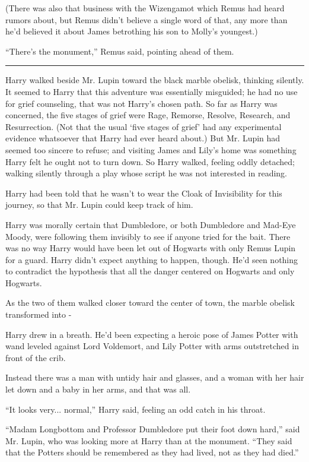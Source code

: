 (There was also that business with the Wizengamot which Remus had heard rumors about, but Remus didn't believe a single word of that, any more than he'd believed it about James betrothing his son to Molly's youngest.)

``There's the monument,'' Remus said, pointing ahead of them.

\begin{center}\rule{3in}{0.4pt}\end{center}

Harry walked beside Mr. Lupin toward the black marble obelisk, thinking silently. It seemed to Harry that this adventure was essentially misguided; he had no use for grief counseling, that was not Harry's chosen path. So far as Harry was concerned, the five stages of grief were Rage, Remorse, Resolve, Research, and Resurrection. (Not that the usual `five stages of grief' had any experimental evidence whatsoever that Harry had ever heard about.) But Mr. Lupin had seemed too sincere to refuse; and visiting James and Lily's home was something Harry felt he ought not to turn down. So Harry walked, feeling oddly detached; walking silently through a play whose script he was not interested in reading.

Harry had been told that he wasn't to wear the Cloak of Invisibility for this journey, so that Mr. Lupin could keep track of him.

Harry was morally certain that Dumbledore, or both Dumbledore and Mad-Eye Moody, were following them invisibly to see if anyone tried for the bait. There was no way Harry would have been let out of Hogwarts with only Remus Lupin for a guard. Harry didn't expect anything to happen, though. He'd seen nothing to contradict the hypothesis that all the danger centered on Hogwarts and only Hogwarts.

As the two of them walked closer toward the center of town, the marble obelisk transformed into -

Harry drew in a breath. He'd been expecting a heroic pose of James Potter with wand leveled against Lord Voldemort, and Lily Potter with arms outstretched in front of the crib.

Instead there was a man with untidy hair and glasses, and a woman with her hair let down and a baby in her arms, and that was all.

``It looks very... normal,'' Harry said, feeling an odd catch in his throat.

``Madam Longbottom and Professor Dumbledore put their foot down hard,'' said Mr. Lupin, who was looking more at Harry than at the monument. ``They said that the Potters should be remembered as they had lived, not as they had died.''

